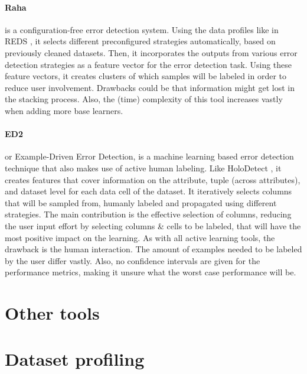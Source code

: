 \paragraph{Raha \cite{Mahdavi2019-zf}} is a configuration-free error detection system. Using the data profiles like in REDS \cite{Mahdavi2019-pk}, it selects different preconfigured strategies automatically, based on previously cleaned datasets. Then, it incorporates the outputs from various error detection strategies as a feature vector for the error detection task. 
Using these feature vectors, it creates clusters of which samples will be labeled in order to reduce user involvement. Drawbacks could be that information might get lost in the stacking process. Also, the (time) complexity of this tool increases vastly when adding more base learners.

\paragraph{ED2 \cite{Neutatz2019-aw}} or Example-Driven Error Detection, is a machine learning based error detection technique that also makes use of active human labeling. 
Like HoloDetect \cite{Heidari2019-ox}, it creates features that cover information on the attribute, tuple (across attributes), and dataset level for each data cell of the dataset. It iteratively selects columns that will be sampled from, humanly labeled and propagated using different strategies. The main contribution is the effective selection of columns, reducing the user input effort by selecting columns \& cells to be labeled, that will have the most positive impact on the learning. As with all active learning tools, the drawback is the human interaction. The amount of examples needed to be labeled by the user differ vastly. Also, no confidence intervals are given for the performance metrics, making it unsure what the worst case performance will be. 

\section{Other tools}



\section{Dataset profiling}

    
